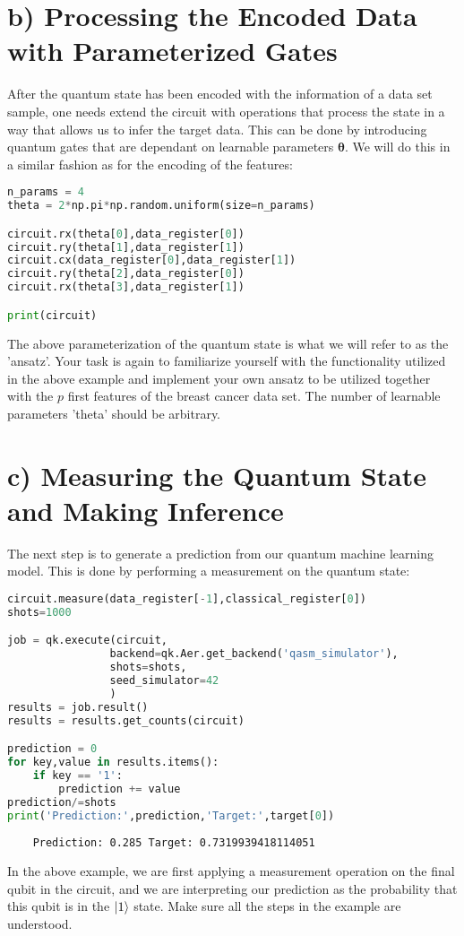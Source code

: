 \documentclass[letterpaper,11pt]{article}
\begin{document}
\section*{b) Processing the Encoded Data with Parameterized Gates}
After the quantum state has been encoded with the information of a data set sample, one needs extend the circuit with operations that process the state in a way that allows us to infer the target data. This can be done by introducing quantum gates that are dependant on learnable parameters $\boldsymbol{\theta}$. We will do this in a similar fashion as for the encoding of the features:

\begin{lstlisting}[language=Python]
n_params = 4
theta = 2*np.pi*np.random.uniform(size=n_params)

circuit.rx(theta[0],data_register[0])
circuit.ry(theta[1],data_register[1])
circuit.cx(data_register[0],data_register[1])
circuit.ry(theta[2],data_register[0])
circuit.rx(theta[3],data_register[1])

print(circuit)
\end{lstlisting}
The above parameterization of the quantum state is what we will refer to as the 'ansatz'. Your task is again to familiarize yourself with the functionality utilized in the above example and implement your own ansatz to be utilized together with the $p$ first features of the breast cancer data set. The number of learnable parameters 'theta' should be arbitrary.

\section*{c) Measuring the Quantum State and Making Inference}
The next step is to generate a prediction from our quantum machine learning model. This is done by performing a measurement on the quantum state:
\begin{lstlisting}[language=Python]
circuit.measure(data_register[-1],classical_register[0])
shots=1000

job = qk.execute(circuit,
                backend=qk.Aer.get_backend('qasm_simulator'),
                shots=shots,
                seed_simulator=42
                )
results = job.result()
results = results.get_counts(circuit)

prediction = 0
for key,value in results.items():
    if key == '1':
        prediction += value
prediction/=shots
print('Prediction:',prediction,'Target:',target[0])
\end{lstlisting}
\begin{verbatim}
    Prediction: 0.285 Target: 0.7319939418114051
\end{verbatim}
In the above example, we are first applying a measurement operation on the final qubit in the circuit, and we are interpreting our prediction as the probability that this qubit is in the $\ket{1}$ state. Make sure all the steps in the example are understood.
\end{document}
